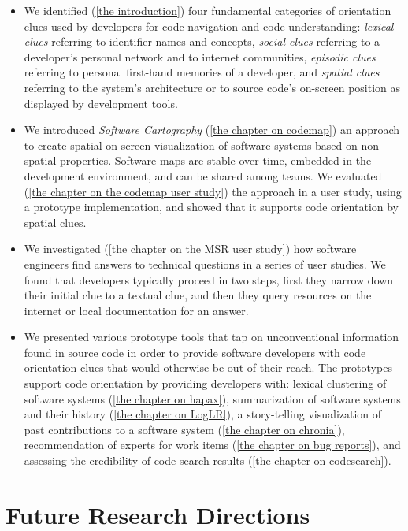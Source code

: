 \begin{itemize}
\item We identified (\autoref{the introduction}) four fundamental categories of orientation clues used by developers for code navigation and code understanding: \emph{lexical clues} referring to identifier names and concepts, \emph{social clues} referring to a developer's personal network and to internet communities, \emph{episodic clues} referring to personal first-hand memories of a developer, and \emph{spatial clues} referring to the system's architecture or to source code's on-screen position as displayed by development tools.
\item We introduced \emph{Software Cartography} (\autoref{the chapter on codemap}) an approach to create spatial on-screen visualization of software systems based on non-spatial properties. Software maps are stable over time, embedded in the development environment, and can be shared among teams. We evaluated (\autoref{the chapter on the codemap user study}) the approach in a user study, using a prototype implementation, and showed that it supports code orientation by spatial clues.
\item We investigated (\autoref{the chapter on the MSR user study}) how software engineers find answers to technical questions in a series of user studies. We found that developers typically proceed in two steps, first they narrow down their initial clue to a textual clue, and then they query resources on the internet or local documentation for an answer.
\item We presented various prototype tools that tap on unconventional information found in source code in order to provide software developers with code orientation clues that would otherwise be out of their reach. The prototypes support code orientation by providing developers with: lexical clustering of software systems (\autoref{the chapter on hapax}), summarization of software systems and their history (\autoref{the chapter on LogLR}), a story-telling visualization of past contributions to a software system (\autoref{the chapter on chronia}), recommendation of experts for work items (\autoref{the chapter on bug reports}), and assessing the credibility of code search results (\autoref{the chapter on codesearch}).
\end{itemize} 

\section{Future Research Directions}

